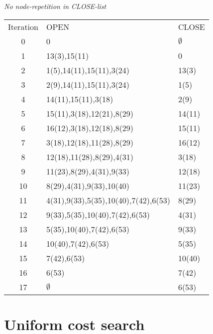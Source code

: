 \documentclass[11pt]{article}
\begin{document}
\emph{No node-repetition in CLOSE-list\\}
\begin{tabular}{ c | l | l }
  Iteration & OPEN & CLOSE \\
  0 	&	0 										& 	$\emptyset$ \\
  1		&	13(3),15(11)							&	0			\\
  2		&	1(5),14(11),15(11),3(24)				&	13(3)		\\
  3		&	2(9),14(11),15(11),3(24)				&	1(5)		\\
  4		&	14(11),15(11),3(18)						&	2(9)		\\
  5		&	15(11),3(18),12(21),8(29)				&	14(11)		\\
  6		&	16(12),3(18),12(18),8(29)				&	15(11)		\\
  7		&	3(18),12(18),11(28),8(29)				&	16(12)		\\
  8		&	12(18),11(28),8(29),4(31)				&	3(18)		\\
  9		&	11(23),8(29),4(31),9(33)				&	12(18)		\\
  10	&	8(29),4(31),9(33),10(40)				&	11(23)		\\
  11	&	4(31),9(33),5(35),10(40),7(42),6(53)	&	8(29)		\\
  12	&	9(33),5(35),10(40),7(42),6(53)			&	4(31)		\\
  13	&	5(35),10(40),7(42),6(53)				&	9(33)		\\
  14	&	10(40),7(42),6(53)						&	5(35)		\\
  15	&	7(42),6(53)								&	10(40)		\\
  16	&	6(53)									&	7(42)		\\
  17	&	$\emptyset$								&	6(53)
 \end{tabular}
\section{Uniform cost search}
\end{document}
